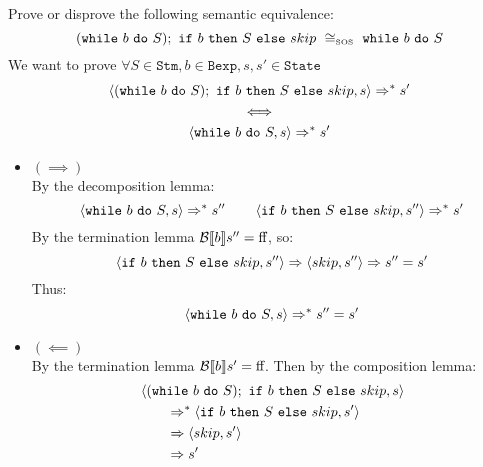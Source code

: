 \begin{exercise}{
    Prove or disprove the following semantic equivalence:
    \[ (\wwhile{b}{S});\ \wif{b}{S}{skip}\ \cong_{\text{\tiny SOS}}\ \wwhile{b}{S} \]
}
    We want to prove $\forall S \in \texttt{Stm}, b \in \texttt{Bexp}, s, s' \in \texttt{State}$
    \begin{gather*}
        \left<(\texttt{while}\ b\ \texttt{do}\ S);\ \texttt{if}\ b\ \texttt{then}\ S\ \texttt{else}\ skip, s\right> \Rightarrow^* s' \\
        \iff \\
        \left<\texttt{while}\ b\ \texttt{do}\ S, s\right> \Rightarrow^* s'
    \end{gather*}
    \begin{itemize}
        \item $(\implies)$ \vspace{0.2cm} \\
            By the decomposition lemma:\vspace*{-0.3cm}
            \[ \left<\texttt{while}\ b\ \texttt{do}\ S, s\right> \Rightarrow^* s'' \qquad \left<\texttt{if}\ b\ \texttt{then}\ S\ \texttt{else}\ skip, s''\right> \Rightarrow^* s' \]
            By the termination lemma $\mathcal{B} \llbracket b \rrbracket s'' = \text{ff}$, so:\vspace*{-0.3cm}
            \[ \left<\texttt{if}\ b\ \texttt{then}\ S\ \texttt{else}\ skip, s''\right> \Rightarrow \left<skip, s''\right> \Rightarrow s'' = s' \]
            Thus:
            \[ \left<\texttt{while}\ b\ \texttt{do}\ S, s\right> \Rightarrow^* s'' = s' \]
        \item $(\impliedby)$ \vspace{0.2cm} \\
            By the termination lemma $\mathcal{B} \llbracket b \rrbracket s' = \text{ff}$. Then by the composition lemma:\vspace*{-0.3cm}
            \begin{align*}
                &\left<(\texttt{while}\ b\ \texttt{do}\ S);\ \texttt{if}\ b\ \texttt{then}\ S\ \texttt{else}\ skip, s\right>
                \\&\qquad \Rightarrow^* \left<\texttt{if}\ b\ \texttt{then}\ S\ \texttt{else}\ skip, s'\right>
                \\&\qquad \Rightarrow \left<skip, s'\right>
                \\&\qquad \Rightarrow s'
            \end{align*}
    \end{itemize}
\end{exercise}
